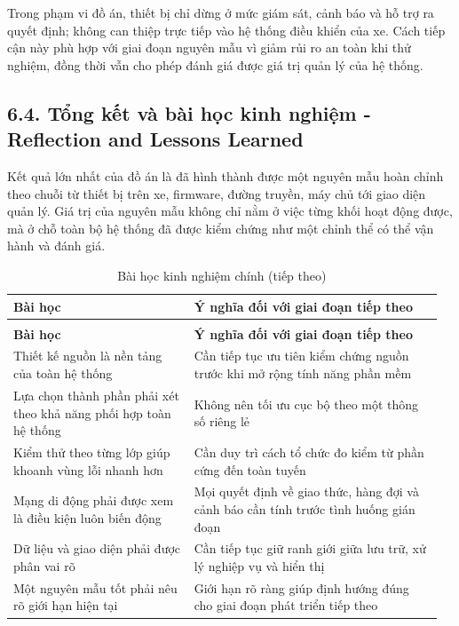 \documentclass[a4paper]{extarticle}
\newcommand{\thesissettableid}[2]{%
  \renewcommand{\thetable}{#1}%
  \renewcommand{\theHtable}{#2}%
}
\begin{document}
Trong phạm vi đồ án, thiết bị chỉ dừng ở mức giám sát, cảnh báo và hỗ trợ ra
quyết định; không can thiệp trực tiếp vào hệ thống điều khiển của xe. Cách tiếp
cận này phù hợp với giai đoạn nguyên mẫu vì giảm rủi ro an toàn khi thử nghiệm,
đồng thời vẫn cho phép đánh giá được giá trị quản lý của hệ thống.

\subsection{6.4. Tổng kết và bài học kinh nghiệm - Reflection and Lessons Learned}\label{tux1ed5ng-kux1ebft-vuxe0-buxe0i-hux1ecdc-kinh-nghiux1ec7m---reflection-and-lessons-learned}

Kết quả lớn nhất của đồ án là đã hình thành được một nguyên mẫu hoàn chỉnh theo
chuỗi từ thiết bị trên xe, firmware, đường truyền, máy chủ tới giao diện quản
lý. Giá trị của nguyên mẫu không chỉ nằm ở việc từng khối hoạt động được, mà ở
chỗ toàn bộ hệ thống đã được kiểm chứng như một chỉnh thể có thể vận hành và
đánh giá.

{\thesissettableid{6.4}{condensed-bang-6-4-bai-hoc-kinh-nghiem-chinh}
\def\LTcaptype{table}
\begin{longtable}{|L{0.407\linewidth}|L{0.553\linewidth}|}
\caption{Bài học kinh nghiệm chính}\label{tab:condensed-bang-6-4-bai-hoc-kinh-nghiem-chinh}\\
\hline
\textbf{Bài học} & \textbf{Ý nghĩa đối với giai đoạn tiếp theo} \\
\hline
\endfirsthead
\caption[]{Bài học kinh nghiệm chính (tiếp theo)}\\
\hline
\textbf{Bài học} & \textbf{Ý nghĩa đối với giai đoạn tiếp theo} \\
\hline
\endhead
\endfoot
\endlastfoot
Thiết kế nguồn là nền tảng của toàn hệ thống & Cần tiếp tục ưu tiên kiểm chứng nguồn trước khi mở rộng tính năng phần mềm \\\hline
Lựa chọn thành phần phải xét theo khả năng phối hợp toàn hệ thống & Không nên tối ưu cục bộ theo một thông số riêng lẻ \\\hline
Kiểm thử theo từng lớp giúp khoanh vùng lỗi nhanh hơn & Cần duy trì cách tổ chức đo kiểm từ phần cứng đến toàn tuyến \\\hline
Mạng di động phải được xem là điều kiện luôn biến động & Mọi quyết định về giao thức, hàng đợi và cảnh báo cần tính trước tình huống gián đoạn \\\hline
Dữ liệu và giao diện phải được phân vai rõ & Cần tiếp tục giữ ranh giới giữa lưu trữ, xử lý nghiệp vụ và hiển thị \\\hline
Một nguyên mẫu tốt phải nêu rõ giới hạn hiện tại & Giới hạn rõ ràng giúp định hướng đúng cho giai đoạn phát triển tiếp theo \\\hline
\end{longtable}
}
\end{document}
